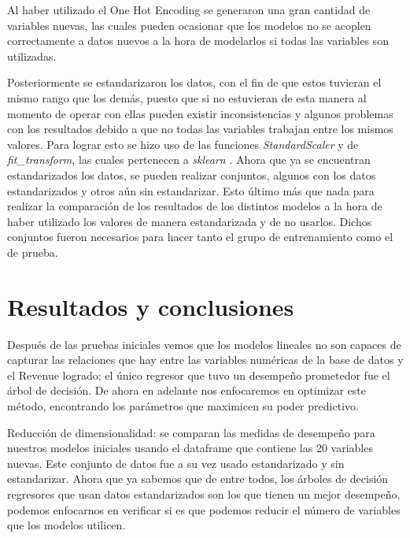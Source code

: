 \documentclass{article}
\begin{document}
        \vspace{4mm}

        Al haber utilizado el One Hot Encoding se generaron una gran cantidad de variables nuevas, las cuales pueden ocasionar que los modelos no se acoplen correctamente a datos nuevos a la hora de modelarlos si todas las variables son utilizadas.

        \vspace{4mm}

        Posteriormente se estandarizaron los datos, con el fin de que estos tuvieran el mismo rango que los demás, puesto que si no estuvieran de esta manera al momento de operar con ellas pueden existir inconsistencias y algunos problemas con los resultados debido a que no todas las variables trabajan entre los mismos valores. Para lograr esto se hizo uso de las funciones \emph{StandardScaler} y de \emph{fit\_transform}, las cuales pertenecen a \emph{sklearn} \parencite{scikit-learn}. Ahora que ya se encuentran estandarizados los datos, se pueden realizar conjuntos, algunos con los datos estandarizados y otros aún sin estandarizar. Esto último más que nada para realizar la comparación de los resultados de los distintos modelos a la hora de haber utilizado los valores de manera estandarizada y de no usarlos. Dichos conjuntos fueron necesarios para hacer tanto el grupo de entrenamiento como el de prueba.

    \section{Resultados y conclusiones}
        Después de las pruebas iniciales vemos que los modelos lineales no son capaces de capturar las relaciones que hay entre las variables numéricas de la base de datos y el Revenue logrado; el único regresor que tuvo un desempeño prometedor fue el árbol de decisión. De ahora en adelante nos enfocaremos en optimizar este método, encontrando los parámetros que maximicen su poder predictivo.

        Reducción de dimensionalidad: se comparan las medidas de desempeño para nuestros modelos iniciales usando el dataframe que contiene las 20 variables nuevas. Este conjunto de datos fue a su vez usado estandarizado y sin estandarizar. Ahora que ya sabemos que de entre todos, los árboles de decisión regresores que usan datos estandarizados son los que tienen un mejor desempeño, podemos enfocarnos en verificar si es que podemos reducir el número de variables que los modelos utilicen.
        
\end{document}
